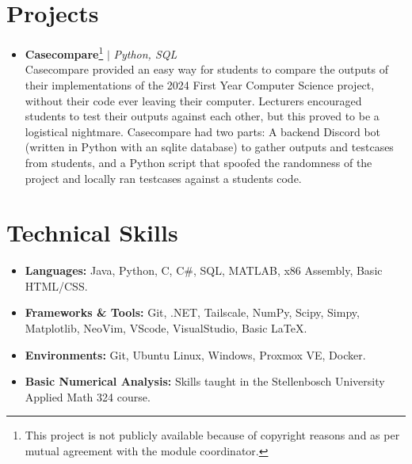 \documentclass[11pt,a4paper]{article}
\begin{document}
\section{Projects}
  \begin{itemize}[leftmargin=1em]
    \item \textbf{Casecompare}\footnote{This project is not publicly available because of copyright reasons and as per mutual agreement with the module coordinator.} $|$ \emph{Python, SQL} \\
    \small
    Casecompare provided an easy way for students to compare the outputs of their implementations of the
      2024 First Year Computer Science project, without their code ever leaving their computer.
      Lecturers encouraged students to test their outputs against each other, but this proved to be a
      logistical nightmare. Casecompare had two parts: A backend Discord bot
      (written in Python with an sqlite database) to gather outputs and testcases from students,
      and a Python script that spoofed the randomness of the project and locally ran testcases against a students code.
  \end{itemize}


\section{Technical Skills}
 \begin{itemize}[leftmargin=0.15in, noitemsep]
     \item \textbf{Languages:}{ Java, Python, C, C\#, SQL, MATLAB, x86 Assembly, Basic HTML/CSS.} 
     \item \textbf{Frameworks \& Tools:}{ Git, .NET, Tailscale, NumPy, Scipy, Simpy, Matplotlib, NeoVim, VScode, VisualStudio, Basic \LaTeX.}
     \item \textbf{Environments:}{ Git, Ubuntu Linux, Windows, Proxmox VE, Docker.}
     \item \textbf{Basic Numerical Analysis:}{ Skills taught in the Stellenbosch University Applied Math 324 course.}

 \end{itemize}
\end{document}
